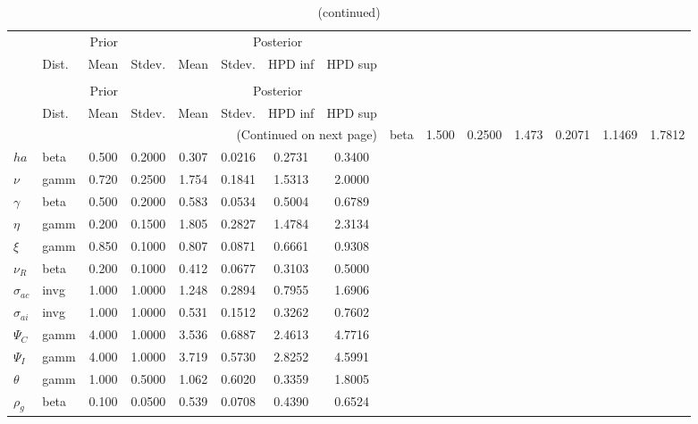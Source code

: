  
\begin{center}
\begin{longtable}{llcccccc} 
\caption{Results from Metropolis-Hastings (parameters)}
 \label{Table:MHPosterior:1}\\
\toprule 
  & \multicolumn{3}{c}{Prior}  &  \multicolumn{4}{c}{Posterior} \\
  \cmidrule(r{.75em}){2-4} \cmidrule(r{.75em}){5-8}
  & Dist. & Mean  & Stdev. & Mean & Stdev. & HPD inf & HPD sup\\
\midrule \endfirsthead 
\caption{(continued)}\\\toprule 
  & \multicolumn{3}{c}{Prior}  &  \multicolumn{4}{c}{Posterior} \\
  \cmidrule(r{.75em}){2-4} \cmidrule(r{.75em}){5-8}
  & Dist. & Mean  & Stdev. & Mean & Stdev. & HPD inf & HPD sup\\
\midrule \endhead 
\bottomrule \multicolumn{8}{r}{(Continued on next page)} \endfoot 
\bottomrule \endlastfoot 
${\sigma}$ & beta &   1.500 & 0.2500 &   1.473& 0.2071 &  1.1469 &  1.7812 \\ 
${ha}$ & beta &   0.500 & 0.2000 &   0.307& 0.0216 &  0.2731 &  0.3400 \\ 
$\nu$ & gamm &   0.720 & 0.2500 &   1.754& 0.1841 &  1.5313 &  2.0000 \\ 
$\gamma$ & beta &   0.500 & 0.2000 &   0.583& 0.0534 &  0.5004 &  0.6789 \\ 
${\eta}$ & gamm &   0.200 & 0.1500 &   1.805& 0.2827 &  1.4784 &  2.3134 \\ 
$\xi$ & gamm &   0.850 & 0.1000 &   0.807& 0.0871 &  0.6661 &  0.9308 \\ 
${\nu_R}$ & beta &   0.200 & 0.1000 &   0.412& 0.0677 &  0.3103 &  0.5000 \\ 
${\sigma_{ac}}$ & invg &   1.000 & 1.0000 &   1.248& 0.2894 &  0.7955 &  1.6906 \\ 
${\sigma_{ai}}$ & invg &   1.000 & 1.0000 &   0.531& 0.1512 &  0.3262 &  0.7602 \\ 
${\Psi_{C}}$ & gamm &   4.000 & 1.0000 &   3.536& 0.6887 &  2.4613 &  4.7716 \\ 
${\Psi_I}$ & gamm &   4.000 & 1.0000 &   3.719& 0.5730 &  2.8252 &  4.5991 \\ 
${\theta}$ & gamm &   1.000 & 0.5000 &   1.062& 0.6020 &  0.3359 &  1.8005 \\ 
${\rho_g}$ & beta &   0.100 & 0.0500 &   0.539& 0.0708 &  0.4390 &  0.6524 \\ 

\end{longtable}
\end{center}
